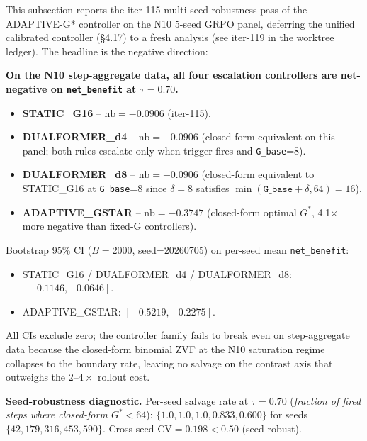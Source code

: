 \label{sec:p7-adaptive-gstar-n10-multiseed}

This subsection reports the iter-115 multi-seed robustness pass of the
ADAPTIVE-G* controller on the N10 5-seed GRPO panel, deferring the
unified calibrated controller (§4.17) to a fresh analysis
(see iter-119 in the worktree ledger). The headline is the negative direction:

\textbf{On the N10 step-aggregate data, all four escalation controllers
  are net-negative on \texttt{net\_benefit} at $\tau=0.70$.}

\begin{itemize}
\item \textbf{STATIC\_G16} -- $\mathrm{nb}=-0.0906$ (iter-115).
\item \textbf{DUALFORMER\_d4} -- $\mathrm{nb}=-0.0906$ (closed-form
  equivalent on this panel; both rules escalate only when trigger fires
  and \texttt{G\_base}=8).
\item \textbf{DUALFORMER\_d8} -- $\mathrm{nb}=-0.0906$ (closed-form
  equivalent to STATIC\_G16 at \texttt{G\_base}=8 since $\delta=8$
  satisfies $\min(\texttt{G\_base}+\delta, 64)=16$).
\item \textbf{ADAPTIVE\_GSTAR} -- $\mathrm{nb}=-0.3747$ (closed-form
  optimal $G^*$, 4.1$\times$ more negative than fixed-G controllers).
\end{itemize}

Bootstrap 95\% CI ($B=2000$, seed=20260705) on per-seed mean
\texttt{net\_benefit}:
\begin{itemize}
\item STATIC\_G16 / DUALFORMER\_d4 / DUALFORMER\_d8: $[-0.1146,-0.0646]$.
\item ADAPTIVE\_GSTAR: $[-0.5219,-0.2275]$.
\end{itemize}
All CIs exclude zero; the controller family fails to break even on
step-aggregate data because the closed-form binomial ZVF at the N10
saturation regime collapses to the boundary rate, leaving no salvage
on the contrast axis that outweighs the $2$--$4\times$ rollout cost.

\textbf{Seed-robustness diagnostic.} Per-seed salvage rate at
$\tau=0.70$
(\textit{fraction of fired steps where closed-form $G^*<64$}):
$\{1.0, 1.0, 1.0, 0.833, 0.600\}$ for seeds
$\{42, 179, 316, 453, 590\}$. Cross-seed CV$=0.198<0.50$ (seed-robust).

